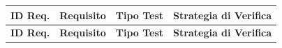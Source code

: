\documentclass[a4paper,11pt,oneside]{scrartcl}
\begin{document}
\begin{longtable}{|p{1.5cm}|p{4.5cm}|p{1.8cm}|p{6cm}|}
    \hline
    \textbf{ID Req.} & \textbf{Requisito}                                                                                                                                                                                                                                                                                    & \textbf{Tipo Test} & \textbf{Strategia di Verifica}                                                                                                                                                                                                                                                                                     \\
    \hline
    \endfirsthead
    \hline
    \textbf{ID Req.} & \textbf{Requisito}                                                                                                                                                                                                                                                                                    & \textbf{Tipo Test} & \textbf{Strategia di Verifica}                                                                                                                                                                                                                                                                                     \\
    \hline
    \endhead


\end{longtable}
\end{document}
